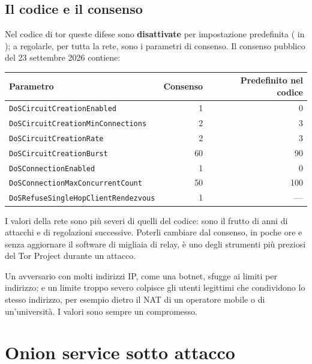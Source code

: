 \subsection{Il codice e il consenso}

Nel codice di tor queste difese sono \textbf{disattivate} per impostazione predefinita ( in ); a regolarle, per tutta la rete, sono i parametri di consenso. Il consenso pubblico del 23 settembre 2026 contiene:
\begin{center}\small
\begin{tabular}{lrr}
\toprule
Parametro & Consenso & Predefinito nel codice \\
\midrule
\texttt{DoSCircuitCreationEnabled} & 1 & 0 \\
\texttt{DoSCircuitCreationMinConnections} & 2 & 3 \\
\texttt{DoSCircuitCreationRate} & 2 & 3 \\
\texttt{DoSCircuitCreationBurst} & 60 & 90 \\
\texttt{DoSConnectionEnabled} & 1 & 0 \\
\texttt{DoSConnectionMaxConcurrentCount} & 50 & 100 \\
\texttt{DoSRefuseSingleHopClientRendezvous} & 1 & --- \\
\bottomrule
\end{tabular}
\end{center}
I valori della rete sono più severi di quelli del codice: sono il frutto di anni di attacchi e di regolazioni successive. Poterli cambiare dal consenso, in poche ore e senza aggiornare il software di migliaia di relay, è uno degli strumenti più preziosi del Tor Project durante un attacco.

\begin{attenzione}
Un avversario con molti indirizzi IP, come una botnet, sfugge ai limiti per indirizzo; e un limite troppo severo colpisce gli utenti legittimi che condividono lo stesso indirizzo, per esempio dietro il NAT di un operatore mobile o di un'università. I valori sono sempre un compromesso.
\end{attenzione}

\section{Onion service sotto attacco}\label{sec:dos-onion}

